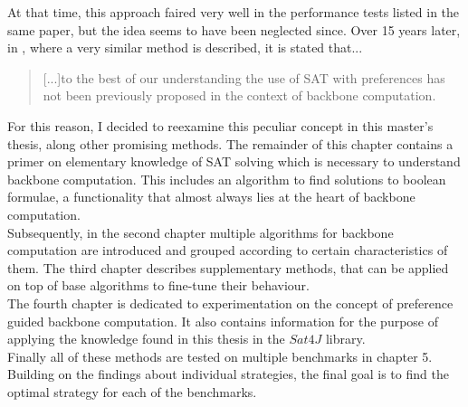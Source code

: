 At that time, this approach faired very well in the performance tests listed in the same paper, but the idea seems to have been neglected since. Over 15 years later, in \cite{PJ18}, where a very similar method is described, it is stated that...
\begin{quotation}
[...]to the best of our understanding the use of SAT with preferences has not been previously proposed in the context of backbone computation.
\end{quotation}

For this reason, I decided to reexamine this peculiar concept in this master's thesis, along other promising methods. The remainder of this chapter contains a primer on elementary knowledge of SAT solving which is necessary to understand backbone computation. This includes an algorithm to find solutions to boolean formulae, a functionality that almost always lies at the heart of backbone computation.\\
Subsequently, in the second chapter multiple algorithms for backbone computation are introduced and grouped according to certain characteristics of them. The third chapter describes supplementary methods, that can be applied on top of base algorithms to fine-tune their behaviour.\\
The fourth chapter is dedicated to experimentation on the concept of preference guided backbone computation. It also contains information for the purpose of applying the knowledge found in this thesis in the $Sat4J$ library. \\
Finally all of these methods are tested on multiple benchmarks in chapter 5. Building on the findings about individual strategies, the final goal is to find the optimal strategy for each of the benchmarks. 


\iffalse
Auch noch andere methoden 
normaler ansatz rechnet halt bisschen lösung aus, aber was wenn man die zu steuert ;
TODO introduction
wofür brauche ich backbones

wer hat sich damit beschäftigt

welche paper waren relevant

wie ist die thesis strukturiert, 

was wurde in den sechs monaten gemacht



hab prefbones erfunden

haben prefbones paper rausgesucht

was kann ich mit prefbones noch so anstellen

wie sehen die praktischen nutzen der prefbones varianten aus.



introduction soll aus perspektive vor dem schreiben geschrieben werden (absichten)

extra chap mit related work
nutzen für endnutzer und wirtschaft.
\fi